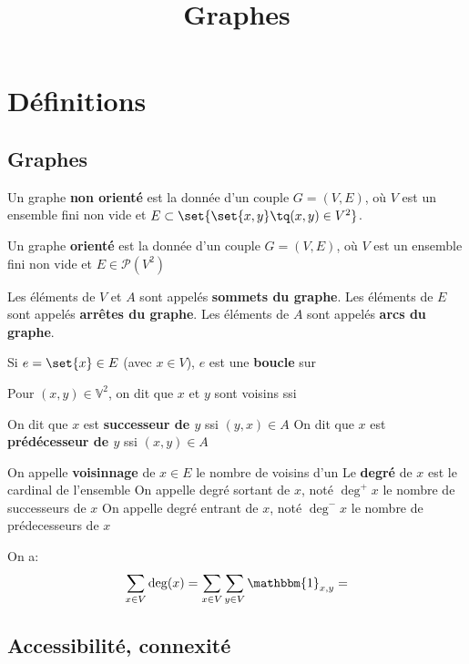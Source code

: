 \documentclass{scrartcl}
\title{Graphes}
\author{}
\date{}
\begin{document}
	\maketitle
	\section{Définitions}
		\subsection{Graphes}
			\semidef Un graphe \textbf{non orienté} est la donnée 
			d'un couple $G = (V,E)$,
			où $V$ est un ensemble fini non vide 
			et $E \subset \set{\set{x,y} \tq (x,y) \in V^2}$.

			 Un graphe \textbf{orienté} est la donnée d'un couple $G = (V,E)$,
			où $V$ est un ensemble fini non vide et 
			$E \in \mathcal{P}(V^2)$

			Les éléments de $V$ et $A$ sont appelés \textbf{sommets du graphe}.
			Les éléments de $E$ sont appelés \textbf{arrêtes du graphe}.
			Les éléments de $A$ sont appelés \textbf{arcs du graphe}.

			Si $e = \set{x} \in E$ (avec $x \in V$), $e$ est une \textbf{boucle} sur
			
			Pour $(x,y) \in \mathbb{V}^2$, on dit que $x$ et $y$ sont voisins ssi

			On dit que $x$ est \textbf{successeur de $y$} ssi $(y,x) \in A$
			On dit que $x$ est \textbf{prédécesseur de $y$} ssi $(x,y) \in A$

			On appelle \textbf{voisinnage} de $x \in E$ le nombre de voisins d'un
			Le \textbf{degré} de $x$ est le cardinal de l'ensemble
			On appelle degré sortant de $x$, noté $\deg^+ x$ le nombre de successeurs de $x$
			On appelle degré entrant de $x$, noté $\deg^- x$ le nombre de prédecesseurs de $x$


			\begin{demo}
				\item On a:
				\[
					\sum_{x \in V} \deg(x)= \sum_{x\in V} \sum_{y\in V} \mathbbm{1}_{{x,y}} = 
				\]
			\end{demo}

		\subsection{Accessibilité, connexité}
			
\end{document}
